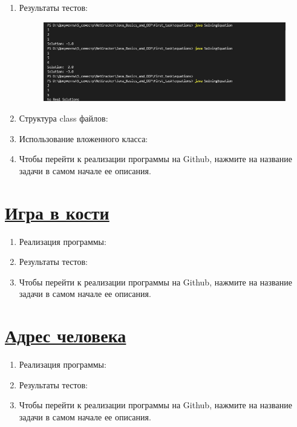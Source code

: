 \documentclass[a4paper]{article}
\begin{document}
\begin{enumerate}
\begin{lstlisting}
\end{lstlisting}

    \item Результаты тестов:
        
        \begin{figure}[h!]
            \begin{center}
                \includegraphics[scale = 0.6]{test_t1.png}
                \label{p2} %
            \end{center}
        \end{figure}
    
    \item Структура class файлов:
    
    \item Использование вложенного класса:
    \item Чтобы перейти к реализации программы на Github, нажмите на название задачи в самом начале ее описания.
    
    

    
\end{enumerate}

\section{\href{https://github.com/julproh/5_sem/tree/main/NetCracker/Java_Basics_and_OOP/first_task/bones}{Игра в кости}} 

    \begin{enumerate}

        \item Реализация программы:
    
        \item Результаты тестов:
        \item Чтобы перейти к реализации программы на Github, нажмите на название задачи в самом начале ее описания.
    
    \end{enumerate}

\section{\href{https://github.com/julproh/5_sem/tree/main/NetCracker/Java_Basics_and_OOP/first_task/address}{Адрес человека}}

    \begin{enumerate}
   
        \item Реализация программы:
    
        \item Результаты тестов:
        \item Чтобы перейти к реализации программы на Github, нажмите на название задачи в самом начале ее описания.
    
    \end{enumerate}
\end{document}
